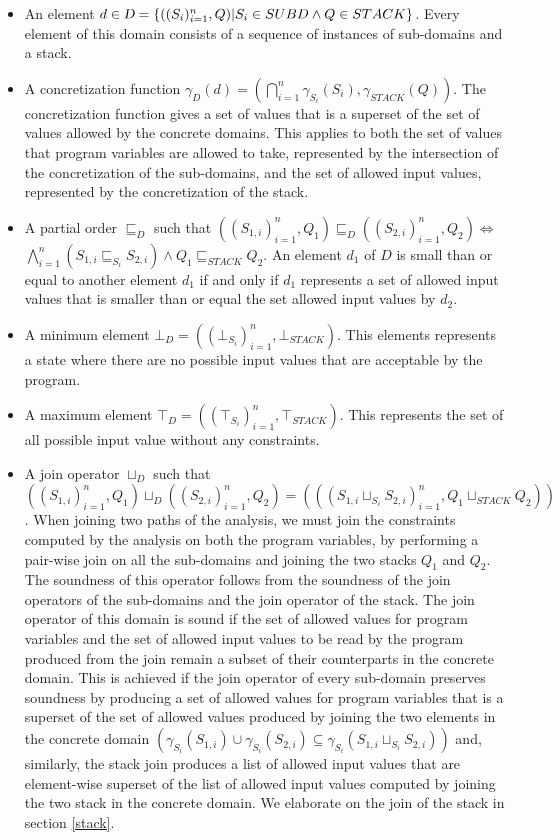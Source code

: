 \documentclass[10pt]{report}
\begin{document}
\begin{itemize}
	\item An element $d \in \textsl{D} = \lbrace ((S_{i})_{i=1}^{n}, Q) \vert S_{i} \in SUBD \wedge Q \in STACK \rbrace$. Every element of this domain consists of a sequence of instances of sub-domains and a stack.
	\item A concretization function $\gamma_{D}(d) =( \bigcap\limits_{i=1}^{n}\gamma_{S_{i}}(S_{i}), \gamma_{STACK}(Q)).$ The concretization function gives a set of values that is a superset of the set of values allowed by the concrete domains. This applies to both the set of values that program variables are allowed to take, represented by the intersection of the concretization of the sub-domains, and the set of allowed input values, represented by the concretization of the stack. 
	 
	\item A partial order $\sqsubseteq_{D}$ such that $ ((S_{1,i})_{i=1}^{n}, Q_{1}) \sqsubseteq_{D} ((S_{2, i})_{i=1}^{n}, Q_{2}) \Longleftrightarrow $ \\ $\bigwedge\limits_{i=1}^{n}(S_{1,i} \sqsubseteq_{S_{i}} S_{2,i}) \wedge Q_{1} \sqsubseteq_{STACK} Q_{2} .$ An element $ d_{1} $ of $ D $ is small than or equal to another element $ d_{1} $ if and only if $ d_{1} $ represents a set of allowed input values that is smaller than or equal the set allowed input values by $ d_{2} $. 
	\item A minimum element $\bot_{D} = ((\bot_{S_{i}})_{i=1}^{n}, \bot_{STACK})$. This elements represents a state where there are no possible input values that are acceptable by the program. 
	\item A maximum element $\top_{D} =  ((\top_{S_{i}})_{i=1}^{n}, \top_{STACK})$. This represents the set of all possible input value without any constraints. 
	\item A join operator $\sqcup_{D}$ such that $ ((S_{1,i})_{i=1}^{n}, Q_{1}) \sqcup_{D} ((S_{2,i})_{i=1}^{n}, Q_{2}) = (((S_{1,i} \sqcup_{S_{i}} S_{2,i})_{i=1}^{n}, Q_{1} \sqcup_{STACK} Q_{2}))$. When joining two paths of the analysis, we must join the constraints computed by the analysis on both the program variables, by performing a pair-wise join on all the sub-domains and joining the two stacks $ Q_{1} $ and $ Q_{2} $. The soundness of this operator follows from the soundness of the join operators of the sub-domains and the join operator of the stack. The join operator of this domain is sound if the set of allowed values for program variables and the set of allowed input values to be read by the program produced from the join remain a subset of their counterparts in the concrete domain. This is achieved if the join operator of every sub-domain preserves soundness by producing a set of allowed values for program variables that is a superset of the set of allowed values produced by joining the two elements in the concrete domain $ (\gamma_{S_{i}}(S_{1,i}) \cup \gamma_{S_{i}}(S_{2,i}) \subseteq \gamma_{S_{i}}(S_{1, i} \sqcup_{S_{i}} S_{2,i})) $ and, similarly, the stack join produces a list of allowed input values that are element-wise superset of the list of allowed input values computed by joining the two stack in the concrete domain. We elaborate on the join of the stack in section \ref{stack}. 
	 

\end{itemize}
\end{document}
